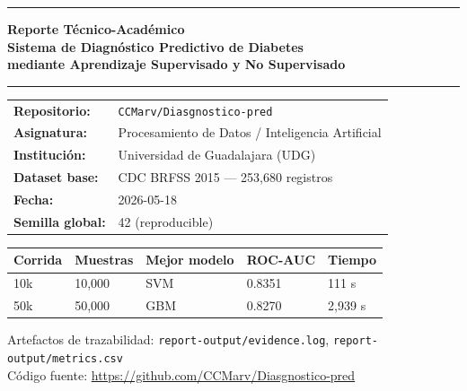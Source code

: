 \documentclass[12pt,a4paper]{article}
\begin{document}
\begin{titlepage}
  \centering
  \vspace*{1cm}

  {\color{azulUDG}\rule{\linewidth}{1.5pt}}
  \vspace{0.3cm}

  {\LARGE\bfseries\color{azulUDG}
    Reporte Técnico-Académico\\[0.4em]
    \large Sistema de Diagnóstico Predictivo de Diabetes\\[0.2em]
    \normalsize mediante Aprendizaje Supervisado y No Supervisado
  }

  \vspace{0.3cm}
  {\color{azulUDG}\rule{\linewidth}{1.5pt}}
  \vspace{1cm}

  \begin{tabular}{ll}
    \textbf{Repositorio:}    & \texttt{CCMarv/Diasgnostico-pred}\\[4pt]
    \textbf{Asignatura:}     & Procesamiento de Datos / Inteligencia Artificial\\[4pt]
    \textbf{Institución:}    & Universidad de Guadalajara (UDG)\\[4pt]
    \textbf{Dataset base:}   & CDC BRFSS 2015 — 253{,}680 registros\\[4pt]
    \textbf{Fecha:}          & 2026-05-18\\[4pt]
    \textbf{Semilla global:} & 42 (reproducible)\\
  \end{tabular}

  \vspace{1.5cm}

  \begin{infobox}
    \begin{tabular}{lllll}
      \toprule
      \textbf{Corrida} & \textbf{Muestras} & \textbf{Mejor modelo} & \textbf{ROC-AUC} & \textbf{Tiempo}\\
      \midrule
      10k & 10{,}000 & SVM & 0.8351 & 111 s\\
      50k & 50{,}000 & GBM & 0.8270 & 2{,}939 s\\
      \bottomrule
    \end{tabular}
  \end{infobox}

  \vfill

  {\small\color{grisTexto}
    Artefactos de trazabilidad: \texttt{report-output/evidence.log},
    \texttt{report-output/metrics.csv}\\
    Código fuente: \url{https://github.com/CCMarv/Diasgnostico-pred}
  }
\end{titlepage}
\end{document}

